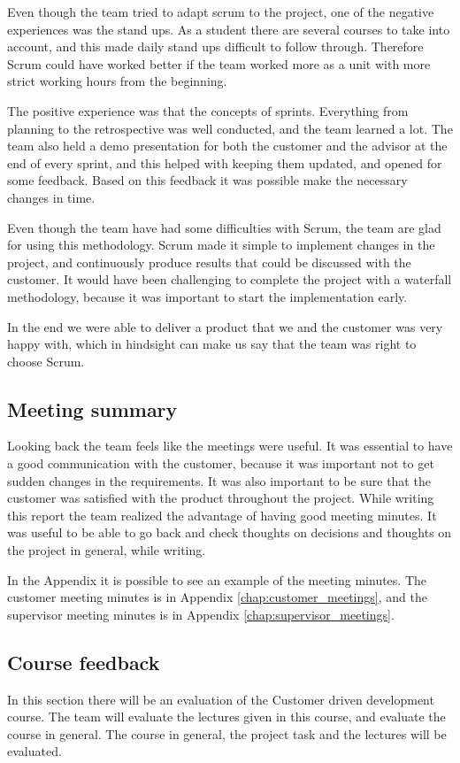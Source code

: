 Even though the team tried to adapt scrum to the project, one of the negative experiences was the stand ups. As a student there are several courses to take into account, and this made daily stand ups difficult to follow through. Therefore Scrum could have worked better if the team worked more as a unit with more strict working hours from the beginning.

The positive experience was that the concepts of sprints. Everything from planning to  the retrospective was well conducted, and the team learned a lot. The team also held a demo presentation for both the customer and the advisor at the end of every sprint, and this helped with keeping them updated, and opened for some feedback. Based on this feedback it was possible make the necessary changes in time.

Even though the team have had some difficulties with Scrum, the team are glad for using this methodology. Scrum made it simple to implement changes in the project, and continuously produce results that could be discussed with the customer. It would have been challenging to complete the project with a waterfall methodology, because it was important to start the implementation early.  

In the end we were able to deliver a product that we and the customer was very happy with, which in hindsight can make us say that the team was right to choose Scrum.

\subsection{Meeting summary}
Looking back the team feels like the meetings were useful. It was essential to have a good communication with the customer, because it was important not to get sudden changes in the requirements. It was also important to be sure that the customer was satisfied with the product throughout the project. While writing this report the team realized the advantage of having good meeting minutes. It was useful to be able to go back and check thoughts on decisions and thoughts on the project in general, while writing.

In the Appendix it is possible to see an example of the meeting minutes. The customer meeting minutes is in Appendix \ref{chap:customer_meetings}, and the supervisor meeting minutes is in Appendix \ref{chap:supervisor_meetings}. 
\subsection{Course feedback}
In this section there will be an evaluation of the Customer driven development course. The team will evaluate the lectures given in this course, and evaluate the course in general.
The course in general, the project task and the lectures will be evaluated.


